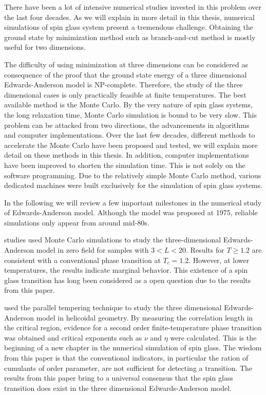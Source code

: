 There have been a lot of intensive numerical studies invested in this problem over 
the last four decades. As we will explain in more detail in this thesis, numerical
simulations of spin glass system present a tremendous challenge. Obtaining the ground
state by minimization method such as branch-and-cut method is mostly useful for 
two dimensions. 

The difficulty of using minimization at three dimensions can be 
considered as consequence of the proof that the ground state energy of a three dimensional
Edwards-Anderson model is NP-complete. Therefore, the study of the three dimensional
cases is only practically feasible at finite temperatures. The best available method
is the Monte Carlo. By the very nature of spin glass systems, the long relaxation time, 
Monte Carlo simulation is bound to be very slow. This problem can be attacked from 
two directions, the advancements in algorithms and computer implementations. 
Over the last few decades, different methods to accelerate the Monte Carlo 
have been proposed and tested, we will explain more detail on these methods in this thesis. 
In addition, computer implementations have been improved to shorten the simulation
time. This is not solely on the software programming. Due to the relatively 
simple Monte Carlo method, various dedicated machines were built exclusively for the simulation
of spin glass systems. 

In the following we will review a few important milestones in the numerical study of
Edwards-Anderson model. Although the model was proposed at 1975, reliable simulations
only appear from around mid-80s.

\citet{Bhatt-Young-1985} studies used Monte Carlo simulations to study the three-dimensional
Edwards-Anderson model in zero field for samples with $3<L<20$. Results for 
$T\ge1.2$ are consistent with a conventional phase transition at $T_c=1.2$.
However, at lower temperatures, the results indicate marginal behavior. This existence
of a spin glass transition has long been considered as a open question due to the
results from this paper. 

\citet{PhysRevB.62.14237} used the parallel tempering technique to study the three dimensional
Edwards-Anderson model in helicoidal geometry. By measuring the correlation length
in the critical region,  evidence for a second order finite-temperature phase 
transition was obtained and critical exponents such as $\nu$ and $\eta$ were 
calculated. This is the beginning of a new chapter in the numerical simulation 
of spin glass. The wisdom from this paper is that the conventional indicators,
in particular the ration of cumulants of order parameter, are not sufficient 
for detecting a transition. The results from this paper bring to a universal
consensus that the spin glass transition does exist in the three dimensional
Edwards-Anderson model.

